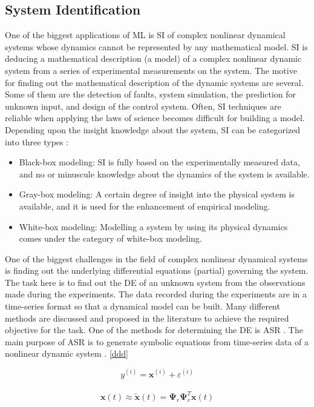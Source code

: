\subsection{System Identification}

One of the biggest applications of \ac{ML} is \ac{SI} of complex nonlinear dynamical systems whose dynamics cannot be represented by any mathematical model. \ac{SI} is deducing a mathematical description (a model) of a complex nonlinear dynamic system from a series of experimental measurements on the system. The motive for finding out the mathematical description of the dynamic systems are several. Some of them are the detection of faults, system simulation, the prediction for unknown input, and design of the control system. Often, \ac{SI} techniques are reliable when applying the laws of science becomes difficult for building a model. Depending upon the insight knowledge about the system, SI can be categorized into three types \cite{ljung1999system}:

\begin{itemize}
	\item Black-box modeling: \ac{SI} is fully based on the experimentally measured data, and no or minuscule knowledge about the dynamics of the system is available.
	\item Gray-box modeling: A certain degree of insight into the physical system is available, and it is used for the enhancement of empirical modeling.
	\item White-box modeling: Modelling a system by using its physical dynamics comes under the category of white-box modeling.
\end{itemize}

One of the biggest challenges in the field of complex nonlinear dynamical systems is finding out the underlying differential equations (partial) governing the system. The task here is to find out the DE of an unknown system from the observations made during the experiments. The data recorded during the experiments are in a time-series format so that a dynamical model can be built. Many different methods are discussed and proposed in the literature to achieve the required objective for the task. One of the methods for determining the \ac{DE} is \ac{ASR} \cite{Bongard2007automated, schmidt2009Distilling}. The main purpose of \ac{ASR} is to generate symbolic equations from time-series data of a nonlinear dynamic system \cite{Bongard2007automated}. \autoref{ddd}

\begin{equation}
\label{ddd}
{{y}^{(i)}}={{\mathbf{x}}^{(i)}}+{{\varepsilon }^{(i)}}
\end{equation}



\begin{align}
\label{GalerkinProj2}
\begin{split}
{{\mathbf x}(t)}\approx{\mathbf{\tilde{x}}}(t)={\mathbf\Psi}_{r}{\mathbf\Psi}_{r}^{T}{\mathbf{x}}(t)
\end{split}
\end{align}
